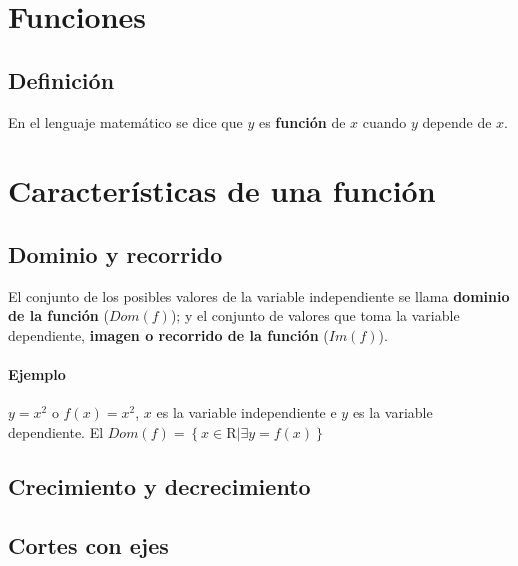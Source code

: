 \section{Funciones}

\subsection{Definición}

En el lenguaje matemático se dice que $y$ es \textbf{función} de $x$ cuando $y$ depende de $x$.

\section{Características de una función}

\subsection{Dominio y recorrido}
El conjunto de los posibles valores de la
variable independiente se llama \textbf{dominio de la función} ($Dom(f)$); y el conjunto de valores que toma la variable dependiente, \textbf{imagen o recorrido de la función} ($Im(f)$).

\paragraph{Ejemplo}
$y=x^2$ o $f(x)=x^2$, $x$ es la variable independiente e $y$ es la variable dependiente. El $Dom(f)=\left\lbrace x \in \mathrm{R} | \exists y=f(x)\right\rbrace$ 	


\subsection{Crecimiento y decrecimiento}
\subsection{Cortes con ejes}
